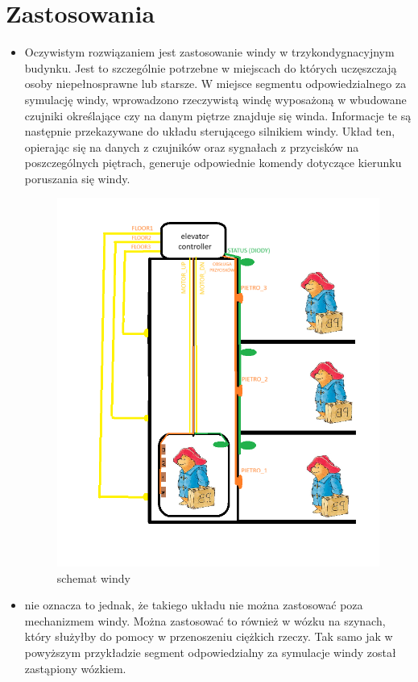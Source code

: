 \documentclass[a4paper]{article}
\begin{document}
\section{Zastosowania}
\begin{itemize}
    \item Oczywistym rozwiązaniem jest zastosowanie windy w trzykondygnacyjnym budynku. Jest to szczególnie potrzebne w miejscach do których uczęszczają osoby niepełnosprawne lub starsze.
 W miejsce segmentu odpowiedzialnego za symulację windy,
  wprowadzono rzeczywistą windę wyposażoną w wbudowane czujniki określające czy na danym piętrze znajduje się winda.
     Informacje te są następnie przekazywane do układu sterującego silnikiem windy.
      Układ ten, opierając się na danych z czujników oraz sygnałach z przycisków na poszczególnych piętrach,
       generuje odpowiednie komendy dotyczące kierunku poruszania się windy.
       
       \begin{figure}[H]
        \centering
        \includegraphics[width=\textwidth]{elevator.png}
        \caption{schemat windy}
    \end{figure}
    \item nie oznacza to jednak, że takiego układu nie można zastosować poza mechanizmem windy. Można zastosować to również w wózku na szynach,
 który służyłby do pomocy w przenoszeniu ciężkich rzeczy. Tak samo jak w powyższym przykładzie segment odpowiedzialny za symulacje windy został zastąpiony wózkiem.
\end{itemize}
\end{document}
